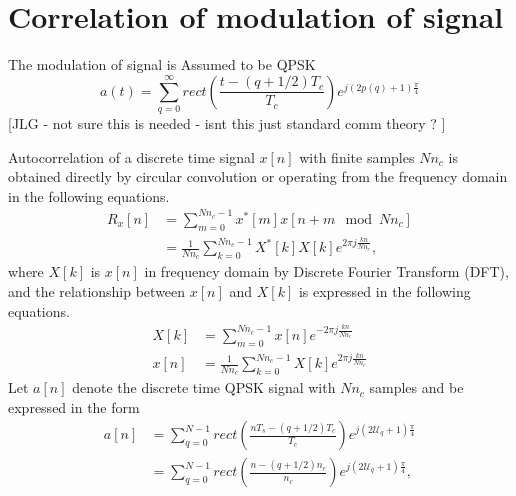 \documentclass[draftcls,onecolumn]{IEEEtran}  %
\begin{document}
   
   
\section{Correlation of modulation of signal} \label{App: Ra}
The modulation of signal is Assumed to be QPSK
\begin{equation}
a(t)=\sum_{q=0}^{\infty}rect(\frac{t-(q+1/2)T_c}{T_c})e^{j(2p(q)+1)\frac{\pi}{4}}
\end{equation}
[JLG - not sure this is needed - isnt this just standard comm theory ? ]

Autocorrelation of a discrete time signal $x[n]$ with finite samples $Nn_c$ is obtained directly by circular convolution or operating from the frequency domain in the following equations.
\begin{equation}\label{Eq: Auto_corx}
\begin{split}
R_x[n] &= \sum\limits_{m=0}^{Nn_c-1} x^*[m] x[n+m \mod Nn_c] \\
	 &= \frac{1}{Nn_c}\sum\limits_{k=0}^{Nn_c-1} X^*[k]X[k] e^{2\pi j \frac{kn}{Nn_c}},
\end{split}
\end{equation}
where $X[k]$ is $x[n]$ in frequency domain by Discrete Fourier Transform (DFT), and the relationship between $x[n]$ and $X[k]$ is expressed in the following equations.
\begin{equation}\label{Eq: xn_XK}
\begin{split}
X[k] &= \sum\limits_{m=0}^{Nn_c-1} x[n] e^{-2\pi j \frac{kn}{Nn_c}} \\
x[n] &= \frac{1}{Nn_c} \sum\limits_{k=0}^{Nn_c-1} X[k] e^{2\pi j \frac{kn}{Nn_c}} 
\end{split}
\end{equation}
Let $a[n]$ denote the discrete time QPSK signal with $Nn_c$ samples and be expressed in the form
\begin{equation}\label{Eq: a_n}
\begin{split}
a[n] &= \sum\limits_{q=0}^{N-1} rect(\frac{nT_s-(q+1/2)T_c}{T_c})e^{j(2\mathcal{U}_q+1)\frac{\pi}{4}} \\ 
	 &= \sum\limits_{q=0}^{N-1} rect(\frac{n-(q+1/2)n_c}{n_c})e^{j(2\mathcal{U}_q+1)\frac{\pi}{4}},    
     \end{split}
\end{equation}
\end{document}
